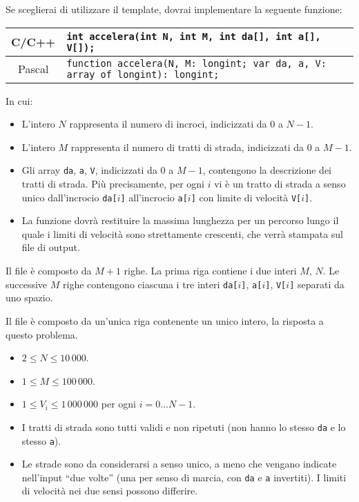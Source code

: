 Se sceglierai di utilizzare il template, dovrai implementare la seguente funzione:
\begin{center}\begin{tabularx}{\textwidth}{|c|X|}
\hline
C/C++  & \verb|int accelera(int N, int M, int da[], int a[], V[]);|\\
\hline
Pascal & \verb|function accelera(N, M: longint; var da, a, V: array of longint): longint;|\\
\hline
\end{tabularx}\end{center}
In cui:
\begin{itemize}[nolistsep]
  \item L'intero $N$ rappresenta il numero di incroci, indicizzati da $0$ a $N-1$.
  \item L'intero $M$ rappresenta il numero di tratti di strada, indicizzati da $0$ a $M-1$.
  \item Gli array \texttt{da}, \texttt{a}, \texttt{V}, indicizzati da $0$ a $M-1$, contengono la descrizione dei tratti di strada. Più precisamente, per ogni $i$ vi è un tratto di strada a senso unico dall'incrocio \texttt{da[$i$]} all'incrocio \texttt{a[$i$]} con limite di velocità \texttt{V[$i$]}.
  \item La funzione dovrà restituire la massima lunghezza per un percorso lungo il quale i limiti di velocità sono strettamente crescenti, che verrà stampata sul file di output.
\end{itemize}

\InputFile
Il file  è composto da $M+1$ righe. La prima riga contiene i due interi $M$, $N$. Le successive $M$ righe contengono ciascuna i tre interi \texttt{da[$i$]}, \texttt{a[$i$]}, \texttt{V[$i$]} separati da uno spazio.

\OutputFile
Il file \outputfile{} è composto da un'unica riga contenente un unico intero, la risposta a questo problema.

\pagebreak
\Constraints
\begin{itemize}[nolistsep, itemsep=2mm]
	\item $2 \le N \le 10\,000$.
	\item $1 \le M \le 100\,000$.
	\item $1 \le V_i \le 1\,000\,000$ per ogni $i=0\ldots N-1$.
	\item I tratti di strada sono tutti validi e non ripetuti (non hanno lo stesso \texttt{da} e lo stesso \texttt{a}).
	\item Le strade sono da considerarsi a senso unico, a meno che vengano indicate nell'input ``due volte'' (una per senso di marcia, con \texttt{da} e \texttt{a} invertiti). I limiti di velocità nei due sensi possono differire.
\end{itemize}

